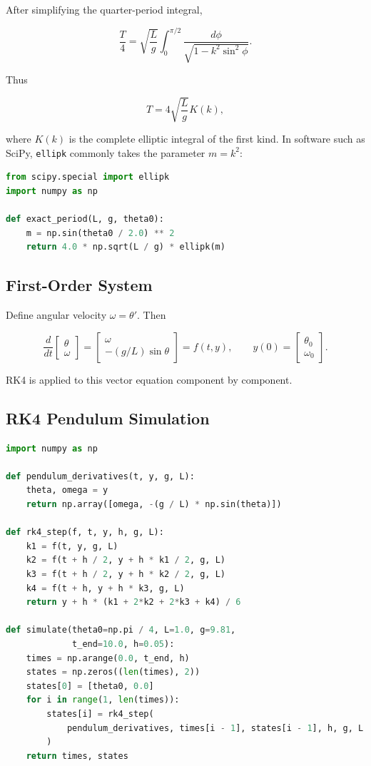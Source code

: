 \documentclass[12pt, a4paper]{article}
\theoremstyle{break}
\providecommand{\passthrough}[1]{#1}
\begin{document}
After simplifying the quarter-period integral,

\[
\frac T4=\sqrt{\frac Lg}\int_0^{\pi/2}
\frac{d\phi}{\sqrt{1-k^2\sin^2\phi}}.
\]

Thus

\[
\boxed{T=4\sqrt{\frac Lg}K(k)},
\]

where \(K(k)\) is the complete elliptic integral of the first kind. In software such as SciPy, \passthrough{\lstinline!ellipk!} commonly takes the parameter \(m=k^2\):

\begin{lstlisting}[language=Python]
from scipy.special import ellipk
import numpy as np

def exact_period(L, g, theta0):
    m = np.sin(theta0 / 2.0) ** 2
    return 4.0 * np.sqrt(L / g) * ellipk(m)
\end{lstlisting}

\subsection{First-Order System}\label{first-order-system}

Define angular velocity \(\omega=\theta'\). Then

\[
\frac d{dt}\begin{bmatrix}\theta\\\omega\end{bmatrix}
=\begin{bmatrix}\omega\\-(g/L)\sin\theta\end{bmatrix}
=f(t,y),
\qquad
y(0)=\begin{bmatrix}\theta_0\\\omega_0\end{bmatrix}.
\]

RK4 is applied to this vector equation component by component.

\subsection{RK4 Pendulum Simulation}\label{rk4-pendulum-simulation}

\begin{lstlisting}[language=Python]
import numpy as np

def pendulum_derivatives(t, y, g, L):
    theta, omega = y
    return np.array([omega, -(g / L) * np.sin(theta)])

def rk4_step(f, t, y, h, g, L):
    k1 = f(t, y, g, L)
    k2 = f(t + h / 2, y + h * k1 / 2, g, L)
    k3 = f(t + h / 2, y + h * k2 / 2, g, L)
    k4 = f(t + h, y + h * k3, g, L)
    return y + h * (k1 + 2*k2 + 2*k3 + k4) / 6

def simulate(theta0=np.pi / 4, L=1.0, g=9.81,
             t_end=10.0, h=0.05):
    times = np.arange(0.0, t_end, h)
    states = np.zeros((len(times), 2))
    states[0] = [theta0, 0.0]
    for i in range(1, len(times)):
        states[i] = rk4_step(
            pendulum_derivatives, times[i - 1], states[i - 1], h, g, L
        )
    return times, states
\end{lstlisting}
\end{document}
